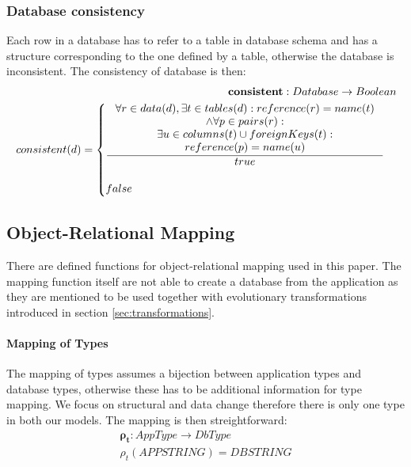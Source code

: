 \documentclass[11pt]{article}
\begin{document}
\subsubsection{Database consistency}
Each row in a database has to refer to a table in database schema and has a structure corresponding to the one defined by a table, otherwise the database is inconsistent. The consistency of database is then:
\begin{align*}
	\mathbf{consistent} : Database \rightarrow Boolean \\
	consistent(d) = \begin{cases}
 		\inference{\forall r \in data(d), \exists t \in tables(d) : reference(r) = name(t) \\ \wedge \forall p \in pairs(r) :\\ \exists u \in columns(t) \cup foreignKeys(t) : \\ reference(p) = name(u)}{true}
 	\\ \\
 	false
 \end{cases}
\end{align*}
 

\subsection{Object-Relational Mapping}
\label{sec:orm}
There are defined functions for object-relational mapping used in this paper. The mapping function itself are not able to create a database from the application as they are mentioned to be used together with evolutionary transformations introduced in section \ref{sec:transformations}.

\paragraph{Mapping of Types} The mapping of types assumes a bijection between application types and database types, otherwise these has to be additional information for type mapping. We focus on structural and data change therefore there is only one type in both our models. The mapping is then streightforward:
\begin{align*}
	\mathbf{\rho_{t}} : AppType \rightarrow DbType  \\
 	\rho_{t}(APPSTRING) = DBSTRING 
\end{align*}
\end{document}
